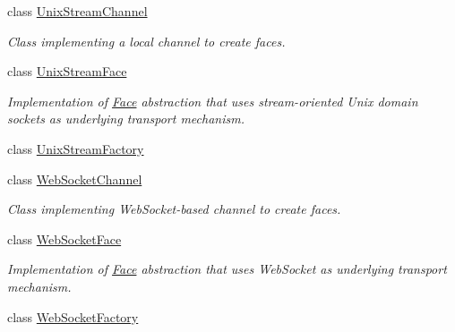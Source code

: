 \begin{DoxyCompactItemize}
\item 
class \hyperlink{classnfd_1_1UnixStreamChannel}{Unix\+Stream\+Channel}
\begin{DoxyCompactList}\small\item\em Class implementing a local channel to create faces. \end{DoxyCompactList}\item 
class \hyperlink{classnfd_1_1UnixStreamFace}{Unix\+Stream\+Face}
\begin{DoxyCompactList}\small\item\em Implementation of \hyperlink{classnfd_1_1Face}{Face} abstraction that uses stream-\/oriented Unix domain sockets as underlying transport mechanism. \end{DoxyCompactList}\item 
class \hyperlink{classnfd_1_1UnixStreamFactory}{Unix\+Stream\+Factory}
\item 
class \hyperlink{classnfd_1_1WebSocketChannel}{Web\+Socket\+Channel}
\begin{DoxyCompactList}\small\item\em Class implementing Web\+Socket-\/based channel to create faces. \end{DoxyCompactList}\item 
class \hyperlink{classnfd_1_1WebSocketFace}{Web\+Socket\+Face}
\begin{DoxyCompactList}\small\item\em Implementation of \hyperlink{classnfd_1_1Face}{Face} abstraction that uses Web\+Socket as underlying transport mechanism. \end{DoxyCompactList}\item 
class \hyperlink{classnfd_1_1WebSocketFactory}{Web\+Socket\+Factory}
\end{DoxyCompactItemize}
